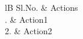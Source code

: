 \documentclass{article}
\begin{document}
	\begin{table}
		\centering
		\begin{tabular}{lB}
			\hline
			Sl.No. & Actions \\
			. & Action1 \\
			2. & Action2 \\
			\hline
		\end{tabular}
		
		\caption{First table}
	\end{table}
\end{document}
